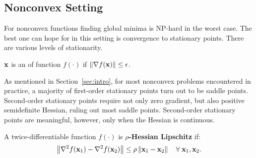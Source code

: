 \subsection{Nonconvex Setting}
For nonconvex functions finding global minima is NP-hard in the worst case. The best one can hope for in this setting is convergence to stationary points. There are various levels of stationarity.
\begin{definition}
$\mathbf{x}$ is an \textbf{\EFSP} of function $f(\cdot)$ if $\left\|{\nabla f(\mathbf{x})}\right\| \le \epsilon$.
\end{definition}
\noindent
As mentioned in Section~\ref{sec:intro}, for most nonconvex problems encountered in practice, a majority of first-order stationary points turn out to be saddle points. Second-order stationary points require not only zero gradient, but also positive semidefinite Hessian, ruling out most saddle points.
Second-order stationary points are meaningful, however, only when the Hessian is continuous.
\begin{definition}\label{def:HessianLip}
A twice-differentiable function $f(\cdot)$ is \textbf{$\rho$-Hessian Lipschitz} if:
\begin{equation*}
\left\|{\nabla^2 f(\mathbf{x}_1) - \nabla^2 f(\mathbf{x}_2)}\right\| \le \rho \left\|{\mathbf{x}_1 - \mathbf{x}_2}\right\| \quad \forall \; \mathbf{x}_1, \mathbf{x}_2.
\end{equation*}
\end{definition}

